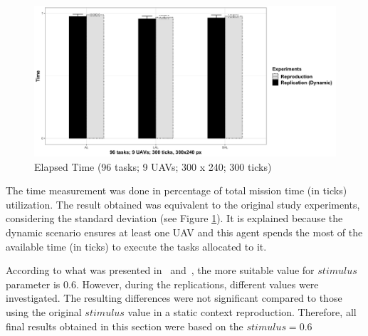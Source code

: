 \begin{figure}[h!]
	\begin{center}
		\includegraphics[scale=0.15]{fig/GRAPH05.png}
		\caption{Elapsed Time (96 tasks; 9 UAVs; 300 x 240; 300 ticks)}
		\label{fig:time}
	\end{center}
\end{figure}

The time measurement was done in percentage of total mission time (in ticks) utilization. The result obtained was equivalent to the original study experiments, considering the standard deviation (see Figure \ref{fig:time}). It is explained because the dynamic scenario ensures at least one UAV and this agent spends the most of the available time (in ticks) to execute the tasks allocated to it.

According to what was presented in~\cite{MAS07} and~\cite{ferreira2007swarm}, the more suitable value for $stimulus$ parameter is $0.6$. However, during the replications, different values were investigated. The resulting differences were not significant compared to those using the original $stimulus$ value in a static context reproduction. Therefore, all final results obtained in this section were based on the $stimulus = 0.6$